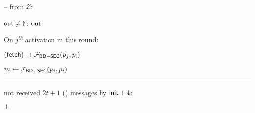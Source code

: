 \begin{bbox}[title={$\Pi_{\msf{Bracha}} (\mathcal{D}, \mathcal{P} = p_1,...,p_n)$ in $\F_{\msf{BD-SEC}}$-hybrid}]
-- \OnInput {} from $\mathcal{Z}$:

	\dquad \If ${\mathsf {out}} \neq \emptyset$: \Output ${\mathsf {out}}$ 

	\dquad \Else On $j^{th}$ activation in this round:

		\dquad \quad \Send $({\mathsf {fetch}}) \rightarrow \mathcal{F}_{{\mathsf {BD-SEC}}}(p_j,p_i)$

		\dquad \quad $m \leftarrow \mathcal{F}_{{\mathsf {BD-SEC}}}(p_j,p_i)$

\vspace{2mm} \hrule \vspace{2mm}

\If not received $2t + 1$ (\textunderscore) messages by ${\mathsf {init}} + 4$:

	\dquad \Output $\bot$

\end{bbox}


